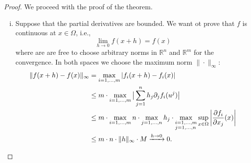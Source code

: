 \documentclass[10pt]{article}
\newcommand{\R}{\mathbb{R}}
\begin{document}
\begin{proof}
    We proceed with the proof of the theorem.
    \begin{enumerate}[(i)]
      \item Suppose that the partial derivatives are bounded. We want ot prove that $f$ is continuous at $x \in \Omega$, i.e.,
      \[\lim_{h \to 0}f(x+h) = f(x)\]
      where are are free to choose arbitrary norms in $\R^{n}$ and $\R^{m}$ for the convergence. 
      In both spaces we choose the maximum norm $\|\cdot\|_{\infty}$:
      \[
        \begin{aligned}
          \|f(x+h)-f(x)\|_{\infty} &= \mathop{\max}_{i = 1,...,m}|f_{i}(x+h)-f_{i}(x)|  \\
                                   & \leq m \cdot \mathop{\max}_{i = 1,...,m} \big|\sum_{j = 1}^{n}h_{j}\partial_{j}f_{i}(u^{j})\big|\\
        & \leq m \cdot \mathop{\max}_{i = 1,...,m} n \cdot \mathop{\max}_{j = 1,...,n}h_{j} \cdot 
      \mathop{\max}_{\begin{subarray}~i = 1,...,m \\ j = 1,...,n \end{subarray}} \mathop{\sup}_{x \in \Omega}
        \left|\frac{\partial f_{i}}{\partial x_{j}}(x)\right| \\
        & \leq m \cdot n \cdot \|h\|_{\infty} \cdot M \xrightarrow[]{h \to 0} 0.
        \end{aligned}
      \]


\end{enumerate}
\end{proof}
\end{document}
